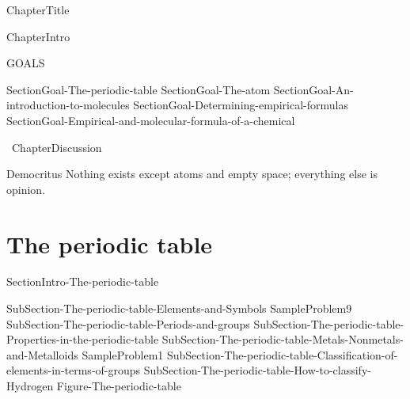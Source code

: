 \documentclass[main.tex]{subfiles}
\newcommand\chapterlabel{Ch-Table}\setcounter{figurenewcounter}{0}\setcounter{tablenewcounter}{0}\setcounter{formulanewcounter}{0}
\begin{document}
\linenumbers
 {ChapterTitle}
 
 
 
\begin{marginfigure}
      \texttt{[image: ../\{\\chapterlabel]}/figure1}
   \end{marginfigure}
   
 {ChapterIntro}
\begin{marginfigure}%
\begin{mytcbox}{GOALS}
\begin{enumerate}[label=\protect\circled{\color{white}\arabic*}]
  {SectionGoal-The-periodic-table}
 {SectionGoal-The-atom}
  {SectionGoal-An-introduction-to-molecules}
 {SectionGoal-Determining-empirical-formulas}
 {SectionGoal-Empirical-and-molecular-formula-of-a-chemical}
\end{enumerate}
\end{mytcbox}
\vspace{1cm}
\begin{tcolorbox}[enhanced,colback=red!5!white,colframe=black!50!red,boxrule=1pt,
  arc=0pt,outer arc=0pt,drop heavy lifted shadow]
\faGears\ 
 {ChapterDiscussion}
 \end{tcolorbox}
\vspace{1cm}    
\begin{shadequote}[l]{Democritus}
Nothing exists except atoms and empty space; everything else is opinion.
\end{shadequote}   
\end{marginfigure}%
\section{The periodic table}
{SectionIntro-The-periodic-table}
\sloppy
\begin{description}
{SubSection-The-periodic-table-Elements-and-Symbols}
{SampleProblem9}
{SubSection-The-periodic-table-Periods-and-groups}
{SubSection-The-periodic-table-Properties-in-the-periodic-table}
{SubSection-The-periodic-table-Metals-Nonmetals-and-Metalloids}
{SampleProblem1}
{SubSection-The-periodic-table-Classification-of-elements-in-terms-of-groups}
{SubSection-The-periodic-table-How-to-classify-Hydrogen}
 {Figure-The-periodic-table}

 \end{description}
\end{document}
